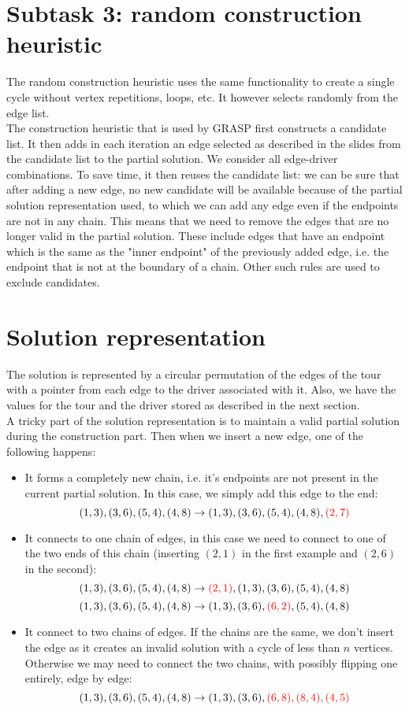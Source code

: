 \documentclass{article}
\begin{document}
\section*{Subtask 3: random construction heuristic}
The random construction heuristic uses the same functionality to create a single cycle without vertex repetitions, loops, etc. It however selects randomly from the edge list.\medskip\\
The construction heuristic that is used by GRASP first constructs a candidate list. It then adds in each iteration an edge selected as described in the slides from the candidate list to the partial solution. We consider all edge-driver combinations. To save time, it then reuses the candidate list: we can be sure that after adding a new edge, no new candidate will be available because of the partial solution representation used, to which we can add any edge even if the endpoints are not in any chain. This means that we need to remove the edges that are no longer valid in the partial solution. These include edges that have an endpoint which is the same as the "inner endpoint" of the previously added edge, i.e. the endpoint that is not at the boundary of a chain. Other such rules are used to exclude candidates.
\section*{Solution representation}
The solution is represented by a circular permutation of the edges of the tour with a pointer from each edge to the driver associated with it. Also, we have the values for the tour and the driver stored as described in the next section.\medskip\\
A tricky part of the solution representation is to maintain a valid partial solution during the construction part. Then when we insert a new edge, one of the following happens:
\begin{itemize}
	\item It forms a completely new chain, i.e. it's endpoints are not present in the current partial solution. In this case, we simply add this edge to the end:
	$$(1,3),(3,6),(5,4),(4,8) \rightarrow (1,3),(3,6),(5,4),(4,8),{\color{red}(2,7)}$$
	\item It connects to one chain of edges, in this case we need to connect to one of the two ends of this chain (inserting $(2,1)$ in the first example and $(2,6)$ in the second):
	$$(1,3),(3,6),(5,4),(4,8) \rightarrow {\color{red}(2,1)},(1,3),(3,6),(5,4),(4,8)$$
	$$(1,3),(3,6),(5,4),(4,8) \rightarrow (1,3),(3,6),{\color{red}(6,2)},(5,4),(4,8)$$
	\item It connect to two chains of edges. If the chains are the same, we don't insert the edge as it creates an invalid solution with a cycle of less than $n$ vertices. Otherwise we may need to connect the two chains, with possibly flipping one entirely, edge by edge:
	$$(1,3),(3,6),(5,4),(4,8) \rightarrow (1,3),(3,6),{\color{red}(6,8),(8,4),(4,5)}$$
\end{itemize}
\end{document}
